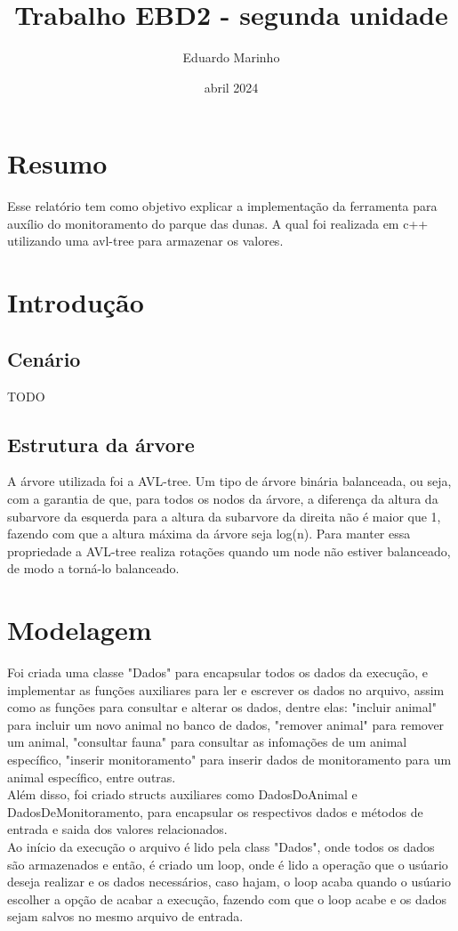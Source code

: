 \documentclass{article}
\title{Trabalho EBD2 - segunda unidade}
\author{Eduardo Marinho}
\date{abril 2024}
\begin{document}
\maketitle

\section{Resumo}
\leavevmode
\indent Esse relatório tem como objetivo explicar a implementação da ferramenta para 
auxílio do monitoramento do parque das dunas. A qual foi realizada em c++ utilizando 
uma avl-tree para armazenar os valores.

\section{Introdução}
\subsection{Cenário}
\leavevmode
\indent TODO
\subsection{Estrutura da árvore}
\leavevmode
\indent A árvore utilizada foi a AVL-tree. Um tipo de árvore binária balanceada, ou seja,
com a garantia de que, para todos os nodos da árvore, a diferença da altura da subarvore
da esquerda para a altura da subarvore da direita não é maior que 1, fazendo com que a
altura máxima da árvore seja log(n). Para manter essa propriedade a AVL-tree realiza
rotações quando um node não estiver balanceado, de modo a torná-lo balanceado.

\section{Modelagem}
\leavevmode
\indent Foi criada uma classe "Dados" para encapsular todos os dados da execução, e implementar
as funções auxiliares para ler e escrever os dados no arquivo, assim como as funções
para consultar e alterar os dados, dentre elas: "incluir animal" para incluir um novo 
animal no banco de dados, "remover animal" para remover um animal, "consultar fauna"
para consultar as infomações de um animal específico, "inserir monitoramento" para 
inserir dados de monitoramento para um animal específico, entre outras. \\
\indent Além disso, foi criado structs auxiliares como DadosDoAnimal e DadosDeMonitoramento,
para encapsular os respectivos dados e métodos de entrada e saida dos valores relacionados.\\
\indent Ao início da execução o arquivo é lido pela class "Dados", onde todos os dados são
armazenados e então, é criado um loop, onde é lido a operação que o usúario deseja
realizar e os dados necessários, caso hajam, o loop acaba quando o usúario escolher
a opção de acabar a execução, fazendo com que o loop acabe e os dados sejam salvos
no mesmo arquivo de entrada.
\end{document}

